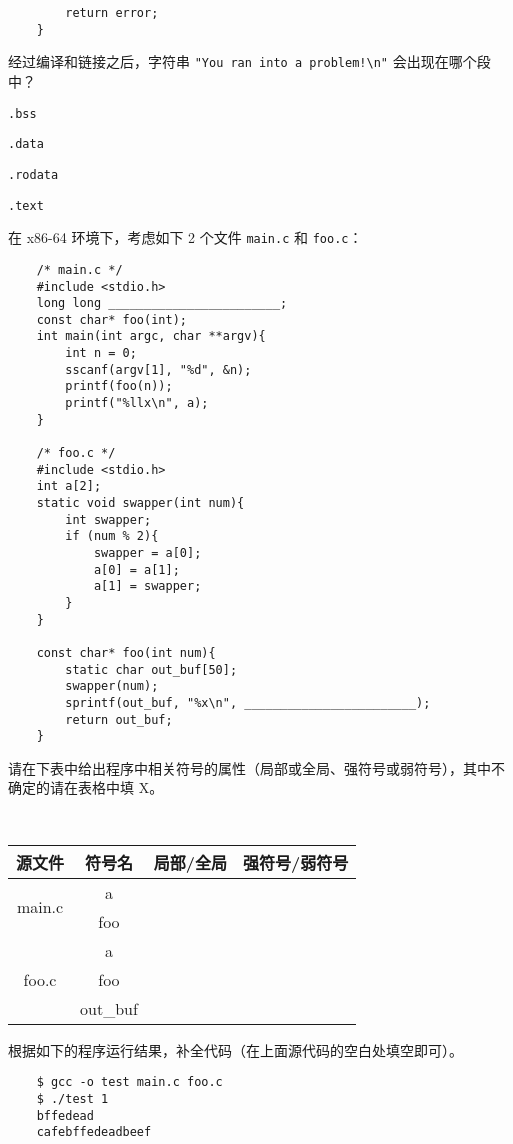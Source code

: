 \begin{problems}
\begin{verbatim}
        return error;
    }
        \end{verbatim}
        经过编译和链接之后，字符串 \verb|"You ran into a problem!\n"| 会出现在哪个段中？
        \begin{choices}
            \item \verb|.bss|
            \item \verb|.data|
            \item \verb|.rodata|
            \item \verb|.text|
        \end{choices}
         在 x86-64 环境下，考虑如下 2 个文件 \verb|main.c| 和 \verb|foo.c|：
        \begin{verbatim}
    /* main.c */
    #include <stdio.h>
    long long ________________________;
    const char* foo(int);
    int main(int argc, char **argv){
        int n = 0;
        sscanf(argv[1], "%d", &n);
        printf(foo(n));
        printf("%llx\n", a);
    }

    /* foo.c */
    #include <stdio.h>
    int a[2];
    static void swapper(int num){
        int swapper;
        if (num % 2){
            swapper = a[0];
            a[0] = a[1];
            a[1] = swapper;
        }
    }

    const char* foo(int num){
        static char out_buf[50];
        swapper(num);
        sprintf(out_buf, "%x\n", ________________________);
        return out_buf;
    }
        \end{verbatim}
        \qn 请在下表中给出程序中相关符号的属性（局部或全局、强符号或弱符号），其中不确定的请在表格中填 X。
        \begin{table}[H]
            \tt
            \centering
            \begin{tabular}{|c|c|c|c|}
                \hline
                源文件 & 符号名 & {\qquad \qquad 局部/全局 \qquad \qquad} & {\qquad \qquad 强符号/弱符号 \qquad \qquad} \\ \hline
                \multirow{2}{*}{main.c} & a &  &  \\ \cline{2-4} 
                & foo &  &  \\ \hline
                \multirow{3}{*}{foo.c} & a &  &  \\ \cline{2-4} 
                & foo &  &  \\ \cline{2-4} 
                & out\_buf &  &  \\ \hline
            \end{tabular}
        \end{table}
        \qn 根据如下的程序运行结果，补全代码（在上面源代码的空白处填空即可）。
        \begin{verbatim}
    $ gcc -o test main.c foo.c
    $ ./test 1
    bffedead
    cafebffedeadbeef
    

\end{verbatim}
\end{problems}

